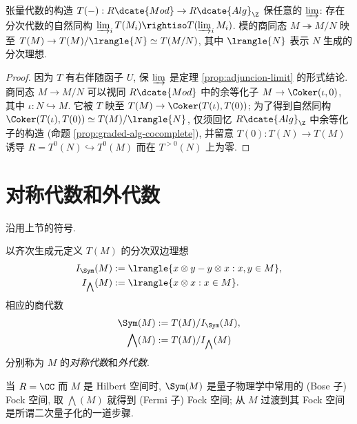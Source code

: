 \begin{corollary}\label{prop:tensor-alg-limit}
	张量代数的构造 $T(-): R\dcate{Mod} \to R\dcate{Alg}_{\Z}$ 保任意的 $\varinjlim$: 存在分次代数的自然同构 $\varinjlim_i T(M_i) \rightiso T(\varinjlim_i M_i)$. 模的商同态 $M \twoheadrightarrow M/N$ 映至 $T(M) \to T(M)/\lrangle{N} \simeq T(M/N)$, 其中 $\lrangle{N}$ 表示 $N$ 生成的分次理想.
\end{corollary}
\begin{proof}
	因为 $T$ 有右伴随函子 $U$, 保 $\varinjlim$ 是定理 \ref{prop:adjuncion-limit} 的形式结论. 商同态 $M \to M/N$ 可以视同 $R\dcate{Mod}$ 中的余等化子 $M \to \Coker(\iota,0)$, 其中 $\iota: N \hookrightarrow M$. 它被 $T$ 映至 $T(M) \to \Coker(T(\iota), T(0))$; 为了得到自然同构 $\Coker(T(\iota), T(0)) \simeq T(M)/\lrangle{N}$, 仅须回忆 $R\dcate{Alg}_{\Z}$ 中余等化子的构造 (命题 \ref{prop:graded-alg-cocomplete}), 并留意 $T(0): T(N) \to T(M)$ 诱导 $R = T^0(N) \hookrightarrow T^0(M)$ 而在 $T^{>0}(N)$ 上为零.
\end{proof}

\section{对称代数和外代数}
沿用上节的符号.
\begin{definition}[对称代数与外代数]\label{def:Sym-wedge}    
	以齐次生成元定义 $T(M)$ 的分次双边理想
	\begin{align*}
		I_{\Sym}(M) & := \lrangle{ x \otimes y - y \otimes x : x,y \in M}, \\
		I_{\bigwedge}(M) & := \lrangle{x \otimes x : x \in M}.
	\end{align*}
	相应的商代数
	\begin{align*}
		\Sym(M) & := T(M)/I_{\Sym}(M), \\
		\bigwedge(M) & := T(M)/I_{\bigwedge}(M)
	\end{align*}
	分别称为 $M$ 的\emph{对称代数}和\emph{外代数}.
\end{definition}

当 $R = \CC$ 而 $M$ 是 Hilbert 空间时, $\Sym(M)$ 是量子物理学中常用的 (Bose 子) Fock 空间, 取 $\bigwedge(M)$ 就得到 (Fermi 子) Fock 空间; 从 $M$ 过渡到其 Fock 空间是所谓二次量子化的一道步骤.

